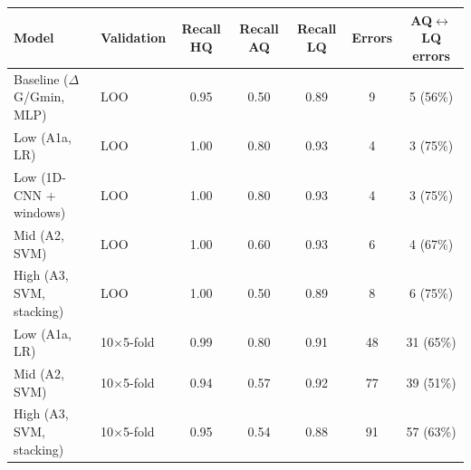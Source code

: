 \begin{tabular}{llccccc}
\toprule
\textbf{Model} & \textbf{Validation} & \textbf{Recall HQ} & \textbf{Recall AQ} & \textbf{Recall LQ} & \textbf{Errors} & \textbf{AQ$\leftrightarrow$LQ errors} \\
\midrule
Baseline ($\Delta$G/Gmin, MLP) & LOO & 0.95 & 0.50 & 0.89 & 9 & 5 (56\%) \\
Low (A1a, LR) & LOO & 1.00 & 0.80 & 0.93 & 4 & 3 (75\%) \\
Low (1D-CNN + windows) & LOO & 1.00 & 0.80 & 0.93 & 4 & 3 (75\%) \\
Mid (A2, SVM) & LOO & 1.00 & 0.60 & 0.93 & 6 & 4 (67\%) \\
High (A3, SVM, stacking) & LOO & 1.00 & 0.50 & 0.89 & 8 & 6 (75\%) \\
Low (A1a, LR) & 10$\times$5-fold & 0.99 & 0.80 & 0.91 & 48 & 31 (65\%) \\
Mid (A2, SVM) & 10$\times$5-fold & 0.94 & 0.57 & 0.92 & 77 & 39 (51\%) \\
High (A3, SVM, stacking) & 10$\times$5-fold & 0.95 & 0.54 & 0.88 & 91 & 57 (63\%) \\
\bottomrule
\end{tabular}
